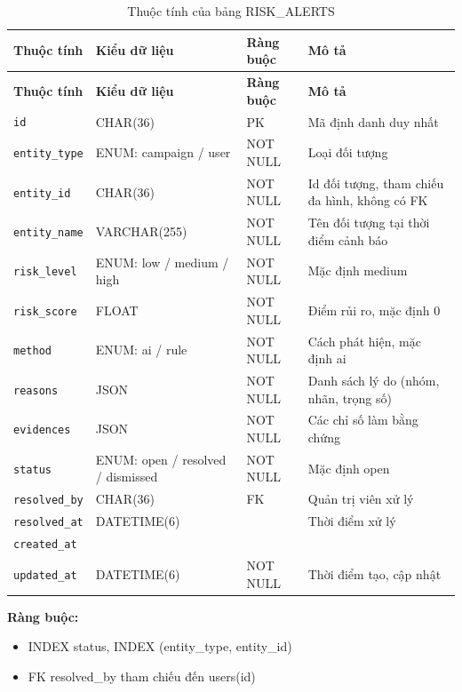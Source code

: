 {\small
\begin{longtable}{|P{3.2cm}|P{2.8cm}|P{2.2cm}|p{5.4cm}|}
    \caption{Thuộc tính của bảng RISK\_\allowbreak{}ALERTS}
    \label{tab:risk_alerts} \\
    \hline
    \textbf{Thuộc tính} & \textbf{Kiểu dữ liệu} & \textbf{Ràng buộc} & \textbf{Mô tả} \\
    \hline
    \endfirsthead
    \hline
    \textbf{Thuộc tính} & \textbf{Kiểu dữ liệu} & \textbf{Ràng buộc} & \textbf{Mô tả} \\
    \hline
    \endhead

    \texttt{id} & CHAR(36) & PK & Mã định danh duy nhất \\
    \hline
    \texttt{entity\_\allowbreak{}type} & ENUM: campaign / user & NOT NULL & Loại đối tượng \\
    \hline
    \texttt{entity\_\allowbreak{}id} & CHAR(36) & NOT NULL & Id đối tượng, tham chiếu đa hình, không có FK \\
    \hline
    \texttt{entity\_\allowbreak{}name} & VARCHAR(255) & NOT NULL & Tên đối tượng tại thời điểm cảnh báo \\
    \hline
    \texttt{risk\_\allowbreak{}level} & ENUM: low / medium / high & NOT NULL & Mặc định medium \\
    \hline
    \texttt{risk\_\allowbreak{}score} & FLOAT & NOT NULL & Điểm rủi ro, mặc định 0 \\
    \hline
    \texttt{method} & ENUM: ai / rule & NOT NULL & Cách phát hiện, mặc định ai \\
    \hline
    \texttt{reasons} & JSON & NOT NULL & Danh sách lý do (nhóm, nhãn, trọng số) \\
    \hline
    \texttt{evidences} & JSON & NOT NULL & Các chỉ số làm bằng chứng \\
    \hline
    \texttt{status} & ENUM: open / resolved / dismissed & NOT NULL & Mặc định open \\
    \hline
    \texttt{resolved\_\allowbreak{}by} & CHAR(36) & FK & Quản trị viên xử lý \\
    \hline
    \texttt{resolved\_\allowbreak{}at} & DATETIME(6) &  & Thời điểm xử lý \\
    \hline
    \texttt{created\_\allowbreak{}at} &  &  &  \\
    \hline
    \texttt{updated\_\allowbreak{}at} & DATETIME(6) & NOT NULL & Thời điểm tạo, cập nhật \\
    \hline
\end{longtable}
}

\textbf{Ràng buộc:}
\begin{itemize}
    \item INDEX status, INDEX (entity\_\allowbreak{}type, entity\_\allowbreak{}id)
    \item FK resolved\_\allowbreak{}by tham chiếu đến users(id)
\end{itemize}

